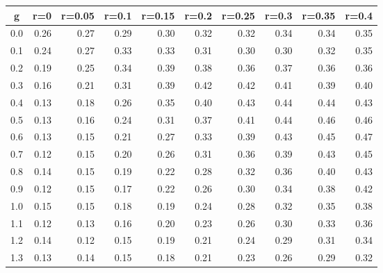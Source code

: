 %
\begin{table}[!tbp]
 \begin{center}
 \begin{tabular}{rrrrrrrrrr}\hline\hline
\multicolumn{1}{c}{g}&\multicolumn{1}{c}{r=0}&\multicolumn{1}{c}{r=0.05}&\multicolumn{1}{c}{r=0.1}&\multicolumn{1}{c}{r=0.15}&\multicolumn{1}{c}{r=0.2}&\multicolumn{1}{c}{r=0.25}&\multicolumn{1}{c}{r=0.3}&\multicolumn{1}{c}{r=0.35}&\multicolumn{1}{c}{r=0.4}\tabularnewline
\hline
0.0&0.26&0.27&0.29&0.30&0.32&0.32&0.34&0.34&0.35\tabularnewline
0.1&0.24&0.27&0.33&0.33&0.31&0.30&0.30&0.32&0.35\tabularnewline
0.2&0.19&0.25&0.34&0.39&0.38&0.36&0.37&0.36&0.36\tabularnewline
0.3&0.16&0.21&0.31&0.39&0.42&0.42&0.41&0.39&0.40\tabularnewline
0.4&0.13&0.18&0.26&0.35&0.40&0.43&0.44&0.44&0.43\tabularnewline
0.5&0.13&0.16&0.24&0.31&0.37&0.41&0.44&0.46&0.46\tabularnewline
0.6&0.13&0.15&0.21&0.27&0.33&0.39&0.43&0.45&0.47\tabularnewline
0.7&0.12&0.15&0.20&0.26&0.31&0.36&0.39&0.43&0.45\tabularnewline
0.8&0.14&0.15&0.19&0.22&0.28&0.32&0.36&0.40&0.43\tabularnewline
0.9&0.12&0.15&0.17&0.22&0.26&0.30&0.34&0.38&0.42\tabularnewline
1.0&0.15&0.15&0.18&0.19&0.24&0.28&0.32&0.35&0.38\tabularnewline
1.1&0.12&0.13&0.16&0.20&0.23&0.26&0.30&0.33&0.36\tabularnewline
1.2&0.14&0.12&0.15&0.19&0.21&0.24&0.29&0.31&0.34\tabularnewline
1.3&0.13&0.14&0.15&0.18&0.21&0.23&0.26&0.29&0.32\tabularnewline
\hline
\end{tabular}

\end{center}

\end{table}


